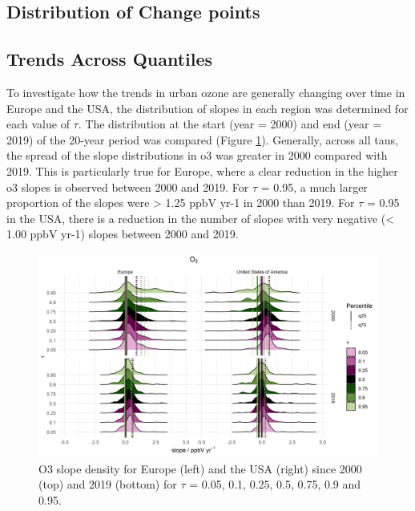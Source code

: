 \documentclass[journal abbreviation, manuscript]{copernicus}
\begin{document}
\subsection{Distribution of Change points}

\subsection{Trends Across Quantiles}

To investigate how the trends in urban ozone are generally changing over time in Europe and the USA, the distribution of slopes in each region was determined for each value of $\tau$. The distribution at the start (year = 2000) and end (year = 2019) of the 20-year period was compared (Figure \ref{o3_ridge_plot}). Generally, across all taus, the spread of the slope distributions in o3 was greater in 2000 compared with 2019. This is particularly true for Europe, where a clear reduction in the higher o3 slopes is observed between 2000 and 2019. For $\tau$ = 0.95, a much larger proportion of the slopes were > 1.25 ppbV yr-1 in 2000 than 2019. For $\tau$ = 0.95 in the USA, there is a reduction in the number of slopes with very negative (< 1.00 ppbV yr-1) slopes between 2000 and 2019.

\begin{figure}[h!]
\includegraphics[width=12cm]{plots/o3_density_ridges_by_tau_continent_2000_2019.png}
\caption{O3 slope density for Europe (left) and the USA (right) since 2000 (top) and 2019 (bottom) for $\tau$ = 0.05, 0.1, 0.25, 0.5, 0.75, 0.9 and 0.95.}
\label{o3_ridge_plot}
\end{figure}
\end{document}
